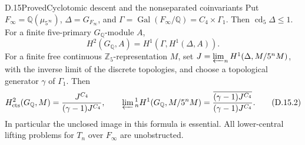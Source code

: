 \begin{statement}{D.15}{Proved}{Cyclotomic descent and the nonseparated coinvariants}
Put \(F_\infty=\mathbb Q(\mu_{5^\infty})\),
\(\Delta=G_{F_\infty}\), and
\(\Gamma=\operatorname{Gal}(F_\infty/\mathbb Q)
=C_4\times\Gamma_1\). Then \(\operatorname{cd}_5\Delta\le1\).
For a finite five-primary \(G_{\mathbb Q}\)-module \(A\),
\[
 H^2(G_{\mathbb Q},A)
 =H^1(\Gamma,H^1(\Delta,A)).                            \tag{D.15.1}
\]
For a finite free continuous \(\mathbb Z_5\)-representation
\(M\), set
\(J=\varprojlim_n H^1(\Delta,M/5^nM)\), with the inverse
limit of the discrete topologies, and choose a topological
generator \(\gamma\) of \(\Gamma_1\). Then
\[
 H^2_{\rm cts}(G_{\mathbb Q},M)
 =\frac{J^{C_4}}{(\gamma-1)J^{C_4}},\qquad
 \varprojlim{}^1_nH^1(G_{\mathbb Q},M/5^nM)
 =\frac{\overline{(\gamma-1)J^{C_4}}}
 {(\gamma-1)J^{C_4}}.                                  \tag{D.15.2}
\]
In particular the unclosed image in this formula is essential.
All lower-central lifting problems for \(T_n\) over
\(F_\infty\) are unobstructed.
\end{statement}
